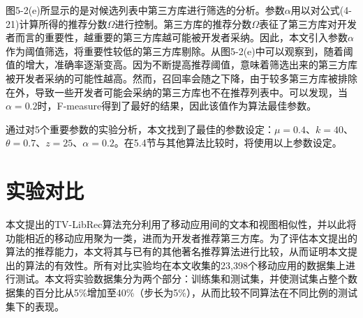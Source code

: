 图5-2(e)所显示的是对候选列表中第三方库进行筛选的分析。参数$\alpha$用以对公式(4-21)计算所得的推荐分数$\Omega$进行控制。第三方库的推荐分数$\Omega$表征了第三方库对开发者而言的重要性，越重要的第三方库越可能被开发者采纳。因此，本文引入参数$\alpha$作为阈值筛选，将重要性较低的第三方库剔除。从图5-2(e)中可以观察到，随着阈值的增大，准确率逐渐变高。因为不断提高推荐阈值，意味着筛选出来的第三方库被开发者采纳的可能性越高。然而，召回率会随之下降，由于较多第三方库被排除在外，导致一些开发者可能会采纳的第三方库也不在推荐列表中。可以发现，当$\alpha=0.2$时，F-measure得到了最好的结果，因此该值作为算法最佳参数。

通过对5个重要参数的实验分析，本文找到了最佳的参数设定：$\mu=0.4$、$k=40$、$\theta=0.7$、$z=25$、$\alpha=0.2$。在5.4节与其他算法比较时，将使用以上参数设定。



\section{实验对比}
本文提出的TV-LibRec算法充分利用了移动应用间的文本和视图相似性，并以此将功能相近的移动应用聚为一类，进而为开发者推荐第三方库。为了评估本文提出的算法的推荐能力，本文将其与已有的其他著名推荐算法进行比较，从而证明本文提出的算法的有效性。所有对比实验均在本文收集的23,398个移动应用的数据集上进行测试。本文将实验数据集分为两个部分：训练集和测试集，并使测试集占整个数据集的百分比从5\%增加至40\%（步长为5\%），从而比较不同算法在不同比例的测试集下的表现。



